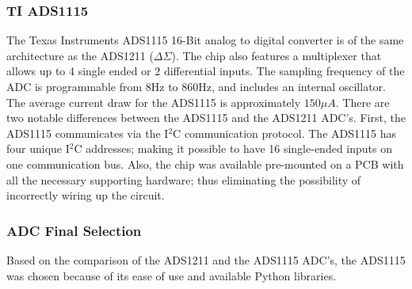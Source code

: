\subsubsection{TI ADS1115}
\label{sec:ADC_ADS1115}
\indent The Texas Instruments ADS1115 16-Bit analog to digital converter is of the same architecture as the ADS1211 ($\Delta \Sigma$). The chip also features a multiplexer that allows up to 4 single ended or 2 differential inputs. The sampling frequency of the ADC is programmable from 8Hz to 860Hz, and includes an internal oscillator. The average current draw for the ADS1115 is approximately $150\mu A$. There are two notable differences between the ADS1115 and the ADS1211 ADC's. First, the ADS1115 communicates via the I$^{2}$C communication protocol. The ADS1115 has four unique I$^{2}$C addresses; making it possible to have 16 single-ended inputs on one communication bus. Also, the chip was available pre-mounted on a PCB with all the necessary supporting hardware; thus eliminating the possibility of incorrectly wiring up the circuit. 
\subsubsection{ADC Final Selection}
\indent Based on the comparison of the ADS1211 and the ADS1115 ADC's, the ADS1115 was chosen because of its ease of use and available Python libraries. 
